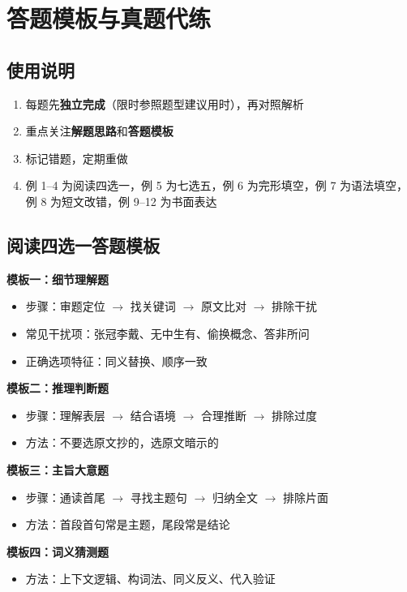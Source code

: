 \section{答题模板与真题代练}

\subsection{使用说明}

\begin{enumerate}
  \item 每题先\textbf{独立完成}（限时参照题型建议用时），再对照解析
  \item 重点关注\textbf{解题思路}和\textbf{答题模板}
  \item 标记错题，定期重做
  \item 例 1--4 为阅读四选一，例 5 为七选五，例 6 为完形填空，例 7 为语法填空，例 8 为短文改错，例 9--12 为书面表达
\end{enumerate}

\subsection{阅读四选一答题模板}

\textbf{模板一：细节理解题}
\begin{itemize}
  \item 步骤：审题定位 $\to$ 找关键词 $\to$ 原文比对 $\to$ 排除干扰
  \item 常见干扰项：张冠李戴、无中生有、偷换概念、答非所问
  \item 正确选项特征：同义替换、顺序一致
\end{itemize}

\textbf{模板二：推理判断题}
\begin{itemize}
  \item 步骤：理解表层 $\to$ 结合语境 $\to$ 合理推断 $\to$ 排除过度
  \item 方法：不要选原文抄的，选原文暗示的
\end{itemize}

\textbf{模板三：主旨大意题}
\begin{itemize}
  \item 步骤：通读首尾 $\to$ 寻找主题句 $\to$ 归纳全文 $\to$ 排除片面
  \item 方法：首段首句常是主题，尾段常是结论
\end{itemize}

\textbf{模板四：词义猜测题}
\begin{itemize}
  \item 方法：上下文逻辑、构词法、同义反义、代入验证
\end{itemize}

